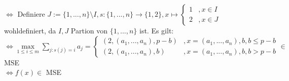 \documentclass{article}
\begin{document}
$\Leftrightarrow$ Definiere $J:=\{1,...,n\} \setminus I, s:\{1,...,n\} \to \{1,2\}, x \mapsto \left\{\begin{array}{cl} 1 & ,x\in I\\ 2 & , x\in J \end{array} \right.$\\

wohldefiniert, da $I,J$ Partion von $\{1,...,n\}$ ist. Es gilt:\\

$\Leftrightarrow\max\limits_{1 \leq i \leq m} \sum\limits_{j:s(j)=i} a_j = \left\{\begin{array}{cl} 
(2,(a_1,...,a_n),p-b)& ,x=(a_1,...,a_n),b,b\leq p-b \\ (2,(a_1,...,a_n),b) & , x=(a_1,...,a_n),b,b >p-b\end{array} \right. \in $MSE\\

$\Leftrightarrow f(x) \in$ MSE
	
	
\end{document}
